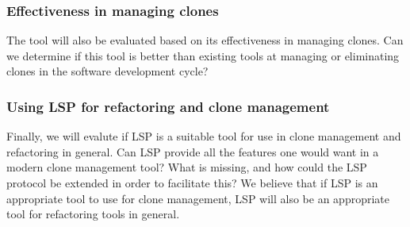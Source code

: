 \documentclass[12pt]{article}
\begin{document}
\subsubsection{Effectiveness in managing clones}

The tool will also be evaluated based on its effectiveness in managing clones. Can we
determine if this tool is better than existing tools at managing or eliminating clones in
the software development cycle?

\subsubsection{Using LSP for refactoring and clone management}

Finally, we will evalute if LSP is a suitable tool for use in clone management and
refactoring in general. Can LSP provide all the features one would want in a modern clone
management tool? What is missing, and how could the LSP protocol be extended in order to
facilitate this? We believe that if LSP is an appropriate tool to use for clone
management, LSP will also be an appropriate tool for refactoring tools in general.



\end{document}
